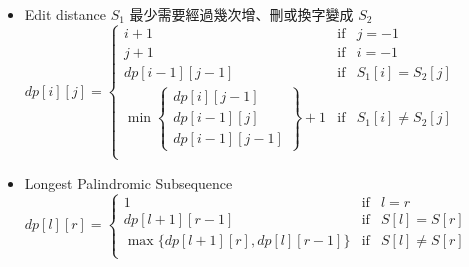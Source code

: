 \begin{itemize}

\item Edit distance
    \subitem $S_1$ 最少需要經過幾次增、刪或換字變成 $S_2$
    \subitem $dp[i][j] = \left \{
        \begin{array}{lrc}
            i+1 & \mbox{if} & j=-1 \\
            j+1 & \mbox{if} & i=-1 \\
            dp[i-1][j-1] & \mbox{if} & S_1[i] = S_2[j] \\
            \min\left \{
                \begin{array}{c}
                    dp[i][j-1] \\ dp[i-1][j] \\ dp[i-1][j-1]
                \end{array}\right \}+1 & \mbox{if} & S_1[i] \neq S_2[j] \\
        \end{array}\right .$

\item Longest Palindromic Subsequence
    \subitem $dp[l][r] = \left \{
        \begin{array}{lrc}
            1 & \mbox{if} & l = r \\
            dp[l+1][r-1] & \mbox{if} & S[l] = S[r] \\
            \max\{dp[l+1][r], dp[l][r-1]\} & \mbox{if} & S[l] \neq S[r] \\
        \end{array}\right .$

\end{itemize}